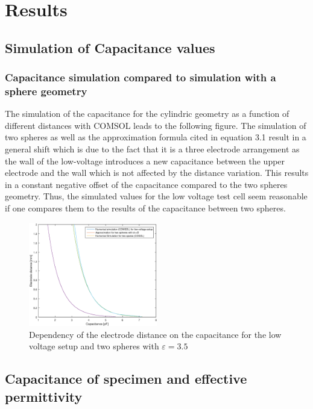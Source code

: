 
\chapter{Results}
\label{chp.results}
\section{Simulation of Capacitance values}
\subsection{Capacitance simulation compared to simulation with a sphere geometry}
The simulation of the capacitance for the cylindric geometry as a function of different distances with COMSOL leads to the following figure. The simulation of two spheres as well as the approximation formula cited in equation 3.1 result in a general 
shift which is due to the fact that it is a three electrode arrangement as the wall of the
low-voltage introduces a new capacitance between the upper electrode and the wall which is not affected by the distance variation. This results in a constant negative offset of the capacitance compared to the 
two spheres geometry. Thus, the simulated values for the low voltage test cell seem reasonable if one compares them to the results of the capacitance between two spheres. \newline 

\begin{figure}[htbp]
	\centering
	\includegraphics[width=0.5\textwidth]{figures/Method/Part1_d_C0/Comparison_Low_voltage_Two_spheres.eps}		
	\caption[Kurze Abbildungsbeschreibung]{Dependency of the electrode distance on the capacitance for the low voltage setup and two spheres with $\varepsilon = 3.5$ } 
	\label{fig.waveforms}
\end{figure}


\section{Capacitance of specimen and effective permittivity}
\label{effective}

